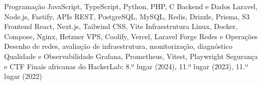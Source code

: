 
\begin{cvskills}
  \cvskill
    {Programação}
    {JavaScript, TypeScript, Python, PHP, C}
  \cvskill
    {Backend e Dados}
    {Laravel, Node.js, Fastify, APIs REST, PostgreSQL, MySQL, Redis, Drizzle, Prisma, S3}
  \cvskill
    {Frontend}
    {React, Next.js, Tailwind CSS, Vite}
  \cvskill
    {Infraestrutura}
    {Linux, Docker, Compose, Nginx, Hetzner VPS, Coolify, Vercel, Laravel Forge}
  \cvskill
    {Redes e Operações}
    {Desenho de redes, avaliação de infraestrutura, monitorização, diagnóstico}
  \cvskill
    {Qualidade e Observabilidade}
    {Grafana, Prometheus, Vitest, Playwright}
  \cvskill
    {Segurança e CTF}
    {Finais africanas do HackerLab: 8.º lugar (2024), 11.º lugar (2023), 11.º lugar (2022)}
\end{cvskills}
